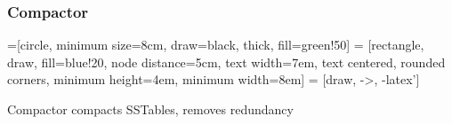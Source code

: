 \documentclass[
	11pt, 
]{beamer}
\begin{document}
\begin{frame}
    \frametitle{Compactor}

    =[circle, minimum size=8cm, draw=black, thick, fill=green!50]
 = [rectangle, draw, fill=blue!20, node distance=5cm,
    text width=7em, text centered, rounded corners, minimum height=4em, minimum width=8em]
 = [draw, ->, -latex']

    \begin{center}
    \end{center}
\begin{boxD}
Compactor compacts SSTables, removes redundancy
\end{boxD}
\end{frame}
\end{document}
